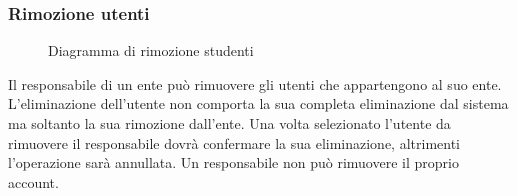 \documentclass[a4paper, titlepage]{article}
\begin{document}
\subsubsection{Rimozione utenti}
\begin{figure}[H]
	\centering
	\noindent{}
	\caption{Diagramma di rimozione studenti}
\end{figure}
Il responsabile di un ente può rimuovere gli utenti che appartengono al suo ente. 
L’eliminazione dell’utente non comporta la sua completa eliminazione dal sistema ma soltanto la sua rimozione dall’ente. Una volta selezionato l’utente da rimuovere il responsabile dovrà confermare la sua eliminazione, altrimenti l’operazione sarà annullata.
\newline Un responsabile non può rimuovere il proprio account.

\newpage
\end{document}

